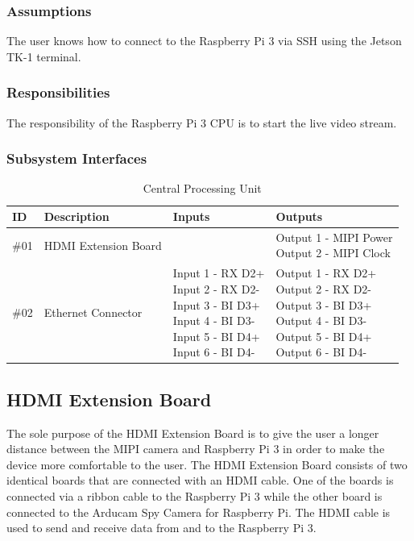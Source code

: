 \subsubsection{Assumptions}
The user knows how to connect to the Raspberry Pi 3 via SSH using the Jetson TK-1 terminal.

\subsubsection{Responsibilities}
The responsibility of the Raspberry Pi 3 CPU is to start the live video stream.

\subsubsection{Subsystem Interfaces}

\begin{table}[H]
\caption {Central Processing Unit}
\begin{center}
	\begin{tabular}{ | p{1cm} | p{6cm} | p{3cm} | p{3cm} |}
	\hline
	ID & Description & Inputs & Outputs \\ \hline
	\#01 & HDMI Extension Board & \pbox{3cm}{Input 1 - MIPI Data} & \pbox{3cm}{Output 1 - MIPI Power \\ Output 2 - MIPI Clock} \\ \hline
	\#02 & Ethernet Connector & \pbox{3cm}{Input 1 - RX D2+ \\ Input 2 - RX D2- \\Input 3 - BI D3+ \\ Input 4 - BI D3- \\ Input 5 - BI D4+ \\Input 6 - BI D4-} & \pbox{3cm}{Output 1 - RX D2+ \\ Output 2 - RX D2- \\ Output 3 - BI D3+ \\ Output 4 - BI D3- \\ Output 5 - BI D4+ \\ Output 6 - BI D4-} \\ \hline
	\end{tabular}
\end{center}
\end{table}

\subsection{HDMI Extension Board}
The sole purpose of the HDMI Extension Board is to give the user a longer distance between the MIPI camera and Raspberry Pi 3 in order to make the device more comfortable to the user. The HDMI Extension Board consists of two identical boards that are connected with an HDMI cable. One of the boards is connected via a ribbon cable to the Raspberry Pi 3 while the other board is connected to the Arducam Spy Camera for Raspberry Pi. The HDMI cable is used to send and receive data from and to the Raspberry Pi 3.


